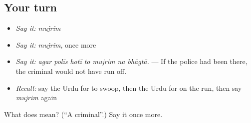 \subsection*{Your turn}
\begin{itemize}
\raggedright
  \item \emph{Say it:} \emph{mujrim}
  \item \emph{Say it:} \emph{mujrim}, once more
  \item \emph{Say it:} \emph{agar polīs hotī to mujrim na bhāgtā.} — If the police had been there, the criminal would not have run off.
  \item \emph{Recall:} say the Urdu for to swoop, then the Urdu for on the run, then say \emph{mujrim} again
\end{itemize}

\begin{tcolorbox}[breakable,colback=teal!4,colframe=teal!35!black,title={Before you move on}]
What does  mean? (\textquotedblleft{}A criminal\textquotedblright{}.) Say it once more.
\end{tcolorbox}
